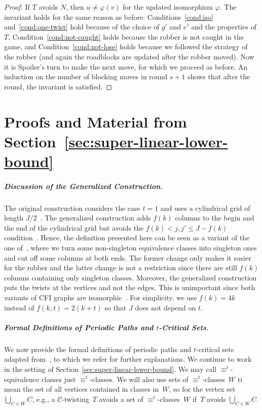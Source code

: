 \documentclass[a4paper,english, thm-restate]{lipics-v2021}
\renewcommand{\phi}{\varphi}
\newcommand{\comp}{\equiv}
\newcommand{\grid}{\mathcal{C}}
\begin{document}
\begin{proof}
      	If $T$ avoids $N$,
      	then $u \neq \phi(v)$ for the updated isomorphism $\phi$.
        The invariant holds for the same reason as before:
        Conditions~\ref{cond:iso} and~\ref{cond:one-twist} hold because
        of the choice of $g'$ and $e'$ and the properties of $T$,
        Condition~\ref{cond:not-caught} holds because the robber is not caught in the game, and Condition~\ref{cond:not-lose} holds because
        we followed the strategy of the robber (and again the roadblocks are updated after the robber moved).
        Now it is Spoiler's turn to make the next move,
        for which we proceed as before.
        An induction on the number of blocking moves in round $s+1$
        shows that after the round, the invariant is satisfied.
\end{proof} 
\section{Proofs and Material from Section~\ref{sec:super-linear-lower-bound}}
\label{a: super-linear-lower-bound}

\subparagraph{Discussion of the Generalized Construction.}
The original construction considers the case $t=1$
and uses a cylindrical grid of length $J/2$~\cite{DBLP:conf/focs/GroheLNS23}.
The generalized construction adds $f(k)$ columns to the begin and the end of the
cylindrical grid but avoids the $f(k) < j,j' \leq J-f(k)$ condition~\cite{RFJN024}.
Hence, the definition presented here can be seen as a variant of the one of~\cite{RFJN024}, where we turn some non-singleton equivalence classes into singleton ones and cut off some columns at both ends.
The former change only makes it easier for the robber and  the latter change
is not a restriction since there are still $f(k)$ columns containing only singleton classes.
Moreover, the generalized construction puts the twists at the vertices
and not the edges. This is unimportant since both variants of CFI graphs are isomorphic~\cite{DawarGraedelLichter22}.
For simplicity, we use $f(k)=4k$ instead of $f(k,t) = 2(k+t)$ so that $J$ does not depend on $t$.


\subparagraph{Formal Definitions of Periodic Paths and $t$-Critical Sets.}
	We now provide the formal definitions of periodic paths and $t$-critical sets
	adapted from~\cite{RFJN024,DBLP:conf/focs/GroheLNS23},
	to which we refer for further explanations.
	We continue to work in the setting of Section~\ref{sec:super-linear-lower-bound}.
	We may call $\comp^t$\nobreakdash-equivalence classes just $\comp^t$-classes.
	We will also use sets of $\comp^t$-classes~$W$ ti mean the set of all vertices contained in classes in~$W$, so for the vertex set $\bigcup_{C\in W}C$,
	e.g., a $\grid$-twisting~$T$ avoids a set of $\comp^t$-classes~$W$
	if~$T$ avoids $\bigcup_{C\in W}C$.
	
\end{document}

